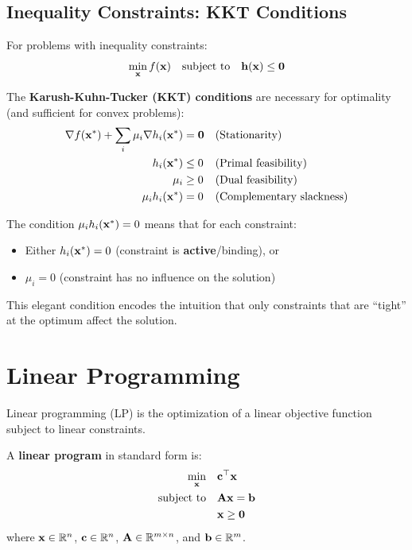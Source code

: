 \subsection{Inequality Constraints: KKT Conditions}

For problems with inequality constraints:
\begin{equation}
\min_{\mathbf{x}} f(\mathbf{x}) \quad \text{subject to} \quad \mathbf{h}(\mathbf{x}) \leq \mathbf{0}
\end{equation}

The \textbf{Karush-Kuhn-Tucker (KKT) conditions} are necessary for optimality (and sufficient for convex problems):
\begin{align}
\nabla f(\mathbf{x}^*) + \sum_i \mu_i \nabla h_i(\mathbf{x}^*) &= \mathbf{0} & &\text{(Stationarity)} \\
h_i(\mathbf{x}^*) &\leq 0 & &\text{(Primal feasibility)} \\
\mu_i &\geq 0 & &\text{(Dual feasibility)} \\
\mu_i h_i(\mathbf{x}^*) &= 0 & &\text{(Complementary slackness)}
\end{align}

\begin{keyconceptbox}[title=Complementary Slackness]
The condition $\mu_i h_i(\mathbf{x}^*) = 0$ means that for each constraint:
\begin{itemize}
    \item Either $h_i(\mathbf{x}^*) = 0$ (constraint is \textbf{active}/binding), or
    \item $\mu_i = 0$ (constraint has no influence on the solution)
\end{itemize}
This elegant condition encodes the intuition that only constraints that are ``tight'' at the optimum affect the solution.
\end{keyconceptbox}

\section{Linear Programming}

Linear programming (LP) is the optimization of a linear objective function subject to linear constraints.

\begin{definitionbox}[title=Definition: Linear Program]
A \textbf{linear program} in standard form is:
\begin{align}
\min_{\mathbf{x}} \quad & \mathbf{c}^\top \mathbf{x} \\
\text{subject to} \quad & \mathbf{A}\mathbf{x} = \mathbf{b} \\
& \mathbf{x} \geq \mathbf{0}
\end{align}
where $\mathbf{x} \in \mathbb{R}^n$, $\mathbf{c} \in \mathbb{R}^n$, $\mathbf{A} \in \mathbb{R}^{m \times n}$, and $\mathbf{b} \in \mathbb{R}^m$.
\end{definitionbox}

